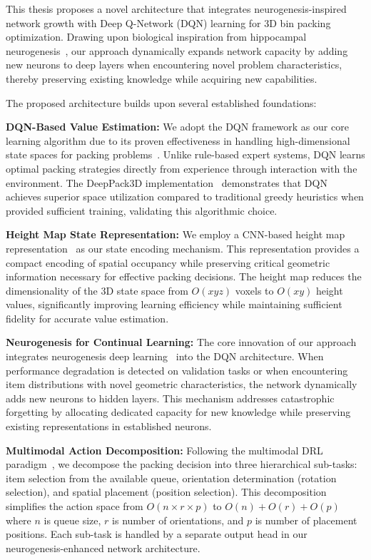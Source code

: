 \documentclass[12pt]{article}
\begin{document}
This thesis proposes a novel architecture that integrates neurogenesis-inspired network growth with Deep Q-Network (DQN) learning for 3D bin packing optimization. Drawing upon biological inspiration from hippocampal neurogenesis~\cite{neurogenesis_dl2017}, our approach dynamically expands network capacity by adding new neurons to deep layers when encountering novel problem characteristics, thereby preserving existing knowledge while acquiring new capabilities.

The proposed architecture builds upon several established foundations:

\textbf{DQN-Based Value Estimation:} We adopt the DQN framework as our core learning algorithm due to its proven effectiveness in handling high-dimensional state spaces for packing problems~\cite{dqn_irregular2023}. Unlike rule-based expert systems, DQN learns optimal packing strategies directly from experience through interaction with the environment. The DeepPack3D implementation~\cite{deeppack3d2025} demonstrates that DQN achieves superior space utilization compared to traditional greedy heuristics when provided sufficient training, validating this algorithmic choice.

\textbf{Height Map State Representation:} We employ a CNN-based height map representation~\cite{cnn_heightmap2024} as our state encoding mechanism. This representation provides a compact encoding of spatial occupancy while preserving critical geometric information necessary for effective packing decisions. The height map reduces the dimensionality of the 3D state space from $O(xyz)$ voxels to $O(xy)$ height values, significantly improving learning efficiency while maintaining sufficient fidelity for accurate value estimation.

\textbf{Neurogenesis for Continual Learning:} The core innovation of our approach integrates neurogenesis deep learning~\cite{neurogenesis_dl2017} into the DQN architecture. When performance degradation is detected on validation tasks or when encountering item distributions with novel geometric characteristics, the network dynamically adds new neurons to hidden layers. This mechanism addresses catastrophic forgetting by allocating dedicated capacity for new knowledge while preserving existing representations in established neurons.

\textbf{Multimodal Action Decomposition:} Following the multimodal DRL paradigm~\cite{multimodal_drl2024}, we decompose the packing decision into three hierarchical sub-tasks: item selection from the available queue, orientation determination (rotation selection), and spatial placement (position selection). This decomposition simplifies the action space from $O(n \times r \times p)$ to $O(n) + O(r) + O(p)$ where $n$ is queue size, $r$ is number of orientations, and $p$ is number of placement positions. Each sub-task is handled by a separate output head in our neurogenesis-enhanced network architecture.
\end{document}
